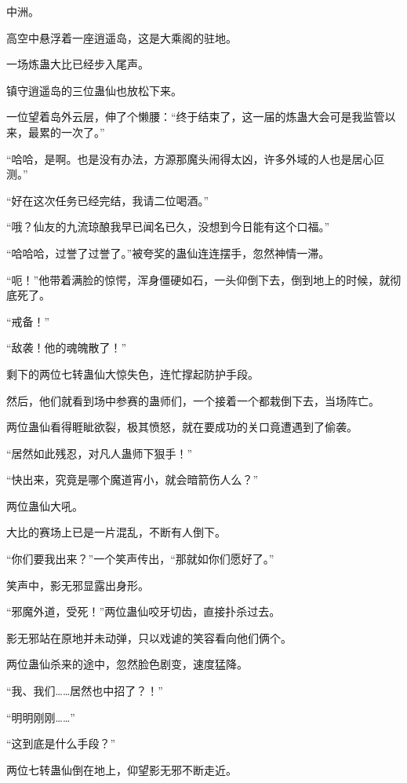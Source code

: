 
\begin{this_body}



中洲。

高空中悬浮着一座逍遥岛，这是大乘阁的驻地。

一场炼蛊大比已经步入尾声。

镇守逍遥岛的三位蛊仙也放松下来。

一位望着岛外云层，伸了个懒腰：“终于结束了，这一届的炼蛊大会可是我监管以来，最累的一次了。”

“哈哈，是啊。也是没有办法，方源那魔头闹得太凶，许多外域的人也是居心叵测。”

“好在这次任务已经完结，我请二位喝酒。”

“哦？仙友的九流琼酿我早已闻名已久，没想到今日能有这个口福。”

“哈哈哈，过誉了过誉了。”被夸奖的蛊仙连连摆手，忽然神情一滞。

“呃！”他带着满脸的惊愕，浑身僵硬如石，一头仰倒下去，倒到地上的时候，就彻底死了。

“戒备！”

“敌袭！他的魂魄散了！”

剩下的两位七转蛊仙大惊失色，连忙撑起防护手段。

然后，他们就看到场中参赛的蛊师们，一个接着一个都栽倒下去，当场阵亡。

两位蛊仙看得睚眦欲裂，极其愤怒，就在要成功的关口竟遭遇到了偷袭。

“居然如此残忍，对凡人蛊师下狠手！”

“快出来，究竟是哪个魔道宵小，就会暗箭伤人么？”

两位蛊仙大吼。

大比的赛场上已是一片混乱，不断有人倒下。

“你们要我出来？”一个笑声传出，“那就如你们愿好了。”

笑声中，影无邪显露出身形。

“邪魔外道，受死！”两位蛊仙咬牙切齿，直接扑杀过去。

影无邪站在原地并未动弹，只以戏谑的笑容看向他们俩个。

两位蛊仙杀来的途中，忽然脸色剧变，速度猛降。

“我、我们……居然也中招了？！”

“明明刚刚……”

“这到底是什么手段？”

两位七转蛊仙倒在地上，仰望影无邪不断走近。


\end{this_body}
